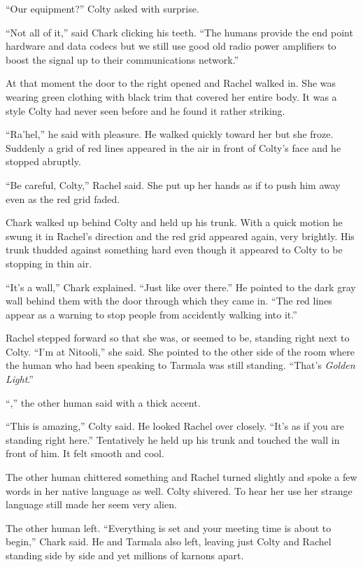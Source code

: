 ``Our equipment?'' Colty asked with surprise.

``Not all of it,'' said Chark clicking his teeth. ``The humans provide the end point hardware
and data codecs but we still use good old radio power amplifiers to boost the signal up to their
communications network.''

At that moment the door to the right opened and Rachel walked in. She was wearing green clothing
with black trim that covered her entire body. It was a style Colty had never seen before and he
found it rather striking.

``Ra'hel,'' he said with pleasure. He walked quickly toward her but she froze. Suddenly a grid
of red lines appeared in the air in front of Colty's face and he stopped abruptly.

``Be careful, Colty,'' Rachel said. She put up her hands as if to push him away even as the red
grid faded.

Chark walked up behind Colty and held up his trunk. With a quick motion he swung it in Rachel's
direction and the red grid appeared again, very brightly. His trunk thudded against something
hard even though it appeared to Colty to be stopping in thin air.

``It's a wall,'' Chark explained. ``Just like over there.'' He pointed to the dark gray wall
behind them with the door through which they came in. ``The red lines appear as a warning to
stop people from accidently walking into it.''

Rachel stepped forward so that she was, or seemed to be, standing right next to Colty. ``I'm at
Nitooli,'' she said. She pointed to the other side of the room where the human who had been
speaking to Tarmala was still standing. ``That's \textit{Golden Light}.''

``,'' the other human said with a thick accent.

``This is amazing,'' Colty said. He looked Rachel over closely. ``It's as if you are standing
right here.'' Tentatively he held up his trunk and touched the wall in front of him. It felt
smooth and cool.

The other human chittered something and Rachel turned slightly and spoke a few words in her
native language as well. Colty shivered. To hear her use her strange language still made her
seem very alien.

The other human left. ``Everything is set and your meeting time is about to begin,'' Chark said.
He and Tarmala also left, leaving just Colty and Rachel standing side by side and yet millions
of karnons apart.

